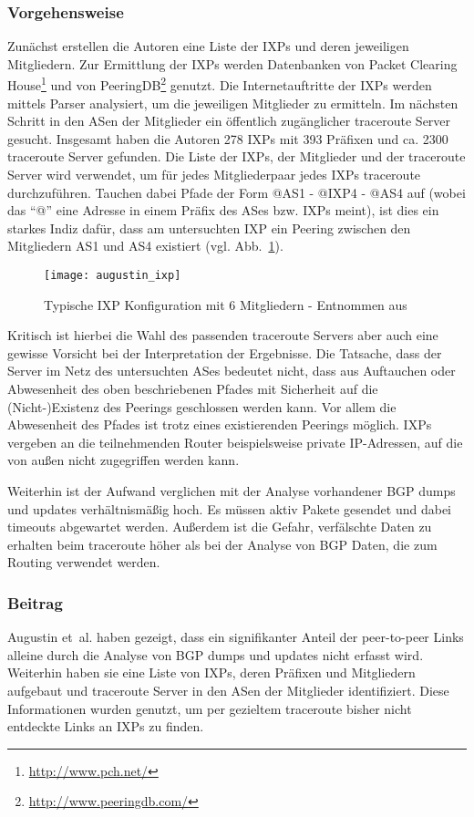 \subsubsection{Vorgehensweise}
Zunächst erstellen die Autoren eine Liste der IXPs und deren jeweiligen Mitgliedern.
Zur Ermittlung der IXPs werden Datenbanken von Packet Clearing House\footnote{\url{http://www.pch.net/}} und von PeeringDB\footnote{\url{http://www.peeringdb.com/}} genutzt.
Die Internetauftritte der IXPs werden mittels Parser analysiert, um die jeweiligen Mitglieder zu ermitteln.
Im nächsten Schritt in den ASen der Mitglieder ein öffentlich zugänglicher traceroute Server gesucht.
Insgesamt haben die Autoren 278 IXPs mit 393 Präfixen und ca. 2300 traceroute Server gefunden.
Die Liste der IXPs, der Mitglieder und der traceroute Server wird verwendet, um für jedes Mitgliederpaar jedes IXPs traceroute durchzuführen.
Tauchen dabei Pfade der Form @AS1 - @IXP4 - @AS4 auf (wobei das "`@"' eine Adresse in einem Präfix des ASes bzw. IXPs meint), ist dies ein starkes Indiz dafür, dass am untersuchten IXP ein Peering zwischen den Mitgliedern AS1 und AS4 existiert (vgl. Abb.~\ref{fig:augustin_ixp}).
\begin{figure}
  \begin{center}
    \texttt{[image: augustin\_ixp]}
    \caption{Typische IXP Konfiguration mit 6 Mitgliedern - Entnommen aus~\cite{Augustin:2009:IM:1644893.1644934}}
    \label{fig:augustin_ixp}
  \end{center}
\end{figure}
Kritisch ist hierbei die Wahl des passenden traceroute Servers aber auch eine gewisse Vorsicht bei der Interpretation der Ergebnisse.
Die Tatsache, dass der Server im Netz des untersuchten ASes bedeutet nicht, dass aus Auftauchen oder Abwesenheit des oben beschriebenen Pfades mit Sicherheit auf die (Nicht-)Existenz des Peerings geschlossen werden kann.
Vor allem die Abwesenheit des Pfades ist trotz eines existierenden Peerings möglich.
IXPs vergeben an die teilnehmenden Router beispielsweise private IP-Adressen, auf die von außen nicht zugegriffen werden kann.

Weiterhin ist der Aufwand verglichen mit der Analyse vorhandener BGP dumps und updates verhältnismäßig hoch.
Es müssen aktiv Pakete gesendet und dabei timeouts abgewartet werden.
Außerdem ist die Gefahr, verfälschte Daten zu erhalten beim traceroute höher als bei der Analyse von BGP Daten, die zum Routing verwendet werden.

\subsubsection{Beitrag}
Augustin et~al. haben gezeigt, dass ein signifikanter Anteil der peer-to-peer Links alleine durch die Analyse von BGP dumps und updates nicht erfasst wird.
Weiterhin haben sie eine Liste von IXPs, deren Präfixen und Mitgliedern aufgebaut und traceroute Server in den ASen der Mitglieder identifiziert.
Diese Informationen wurden genutzt, um per gezieltem traceroute bisher nicht entdeckte Links an IXPs zu finden.

